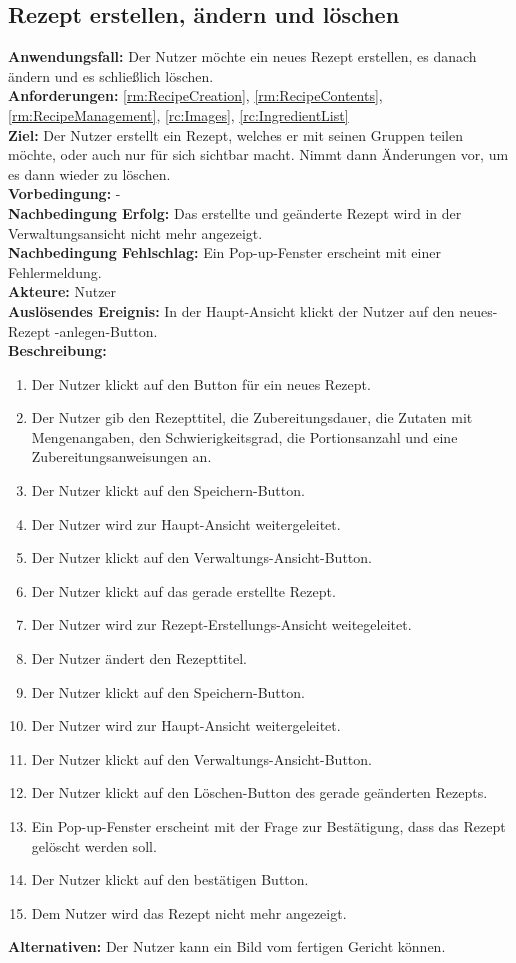 \documentclass[parskip=full]{scrartcl}
\begin{document}
\subsection{Rezept erstellen, ändern und löschen}
\textbf{Anwendungsfall:} Der Nutzer möchte ein neues Rezept erstellen, es danach ändern und es schließlich löschen.\\
\textbf{Anforderungen:} \ref{rm:RecipeCreation}, \ref{rm:RecipeContents}, \ref{rm:RecipeManagement}, \ref{rc:Images}, \ref{rc:IngredientList}\\
\textbf{Ziel:} Der Nutzer erstellt ein Rezept, welches er mit seinen Gruppen teilen möchte, oder auch nur für sich sichtbar macht. Nimmt dann Änderungen vor, um es dann wieder zu löschen.\\
\textbf{Vorbedingung:} -\\
\textbf{Nachbedingung Erfolg:} Das erstellte und geänderte Rezept wird in der Verwaltungsansicht nicht mehr angezeigt.  \\
\textbf{Nachbedingung Fehlschlag:} Ein Pop-up-Fenster erscheint mit einer Fehlermeldung.\\
\textbf{Akteure:} Nutzer\\
\textbf{Auslösendes Ereignis:} In der Haupt-Ansicht klickt der Nutzer auf den neues-Rezept -anlegen-Button.\\
\textbf{Beschreibung:}
\begin{enumerate}
    \item Der Nutzer klickt auf den Button für ein neues Rezept.
    \item Der Nutzer gib den Rezepttitel, die Zubereitungsdauer, die Zutaten mit Mengenangaben, den Schwierigkeitsgrad, die Portionsanzahl und eine Zubereitungsanweisungen an.
    \item Der Nutzer klickt auf den Speichern-Button.
    \item Der Nutzer wird zur Haupt-Ansicht weitergeleitet.
    \item Der Nutzer klickt auf den Verwaltungs-Ansicht-Button.
    \item Der Nutzer klickt auf das gerade erstellte Rezept.
    \item Der Nutzer wird zur Rezept-Erstellungs-Ansicht weitegeleitet.
    \item Der Nutzer ändert den Rezepttitel.
    \item Der Nutzer klickt auf den Speichern-Button.
    \item Der Nutzer wird zur Haupt-Ansicht weitergeleitet.
    \item Der Nutzer klickt auf den Verwaltungs-Ansicht-Button.
    \item Der Nutzer klickt auf den Löschen-Button des gerade geänderten Rezepts.
    \item Ein Pop-up-Fenster erscheint mit der Frage zur Bestätigung, dass das Rezept gelöscht werden soll.
    \item Der Nutzer klickt auf den bestätigen Button.
    \item Dem Nutzer wird das Rezept nicht mehr angezeigt.
\end{enumerate}
\textbf{Alternativen:} Der Nutzer kann ein Bild vom fertigen Gericht können.
\newpage
\end{document}
